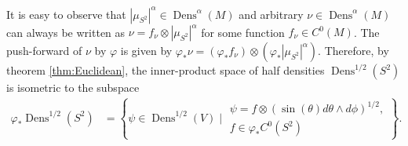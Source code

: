 \documentclass[letterpaper, 12 pt]{amsart}
\newtheorem{prop}[thm]{Proposition}
\DeclareMathOperator{\Dens}{Dens}
\begin{document}
  It is easy to observe that $|\mu_{S^2}|^\alpha \in \Dens^\alpha(M)$
  and arbitrary $\nu \in \Dens^\alpha(M)$ can always be written
  as $\nu = f_{\nu} \otimes |\mu_{S^2}|^\alpha$ for some function 
  $f_\nu \in C^0(M)$.
  The push-forward of $\nu$ by $\varphi$ is given by
  $\varphi_*\nu = (\varphi_*f_\nu) \otimes (\varphi_*|\mu_{S^2}|^\alpha)$.
  Therefore, by theorem \ref{thm:Euclidean},
  the inner-product space of half densities $\Dens^{1/2}(S^2)$
  is isometric to the subspace
  \begin{align*}
    \varphi_* \Dens^{1/2}(S^2) &= \left\{ \psi \in \Dens^{1/2}(V) \mid 
    	\begin{array}{l}
		\psi = f \otimes  (\sin(\theta) d\theta \wedge d\phi)^{1/2} , \\
		f \in \varphi_*C^0(S^2)
	\end{array}
	\right\}.
  \end{align*}



\end{document}
